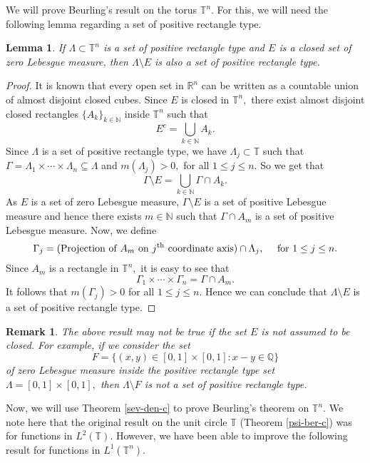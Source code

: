 \documentclass [11pt]{amsart}
\newtheorem{rem}{Remark}[section]
\newtheorem{Lem}{Lemma}[section]
\newcommand{\R}{\mathbb R}
\newcommand{\T}{\mathbb T}
\newcommand{\N}{\mathbb N}
\newcommand{\txt} {\textmd}
\numberwithin{equation}{section}
\begin{document}
We will prove Beurling's result on the torus $\T^n.$ For this, we will need the following lemma regarding a set of positive rectangle type.
\begin{Lem}\label{positive rectangle type}
	If $\Lambda\subset \T^n$ is a set of positive rectangle type and $E$ is a closed set of zero Lebesgue measure, then $\Lambda \setminus E$ is also a set of positive rectangle type. 
\end{Lem} 
\begin{proof}
	 It is known that every open set in $\R^n$ can be written as a countable union of almost disjoint closed cubes. Since $E$ is closed in $\T^n,$ there exist almost disjoint closed rectangles $\{A_k\}_{k\in \N}$ inside $\T^n$ such that 
	$$ E^c=\bigcup_{k\in \N} A_k.$$
	Since $\Lambda$ is a set of positive rectangle type, we have $\Lambda_j\subset \T$ such that $\Gamma = \Lambda_1\times \cdots \times \Lambda_n \subseteq \Lambda$ and $m(\Lambda_j)>0,$ for all $1\leq j \leq n.$ So we get that $$\Gamma \setminus E= \bigcup_{k\in \N}\Gamma \cap A_k.$$
	As $E$ is a set of zero Lebesgue measure, $\Gamma \setminus E$ is a set of positive Lebesgue measure and hence there exists $m\in \N$ such that $\Gamma \cap A_m$ is a set of positive Lebesgue measure. Now, we define  
	$$\Gamma_j= (\text{Projection of  } A_m \text{ on } j^{\txt{th}} \text{ coordinate axis}) \cap \Lambda_j, \quad \txt{ for } 1\leq j \leq n. $$
	Since $A_m$ is a rectangle in $\T^n,$ it is easy to see that 
	$$\Gamma_1\times \cdots \times \Gamma_n =\Gamma \cap A_m.$$
	It follows that $m(\Gamma_j)>0$ for all $1\leq j \leq n.$ Hence we can conclude that $\Lambda\setminus E$ is a set of positive rectangle type.
\end{proof}

\begin{rem}
The above result may not be true if the set $E$ is not assumed to be closed. For example, if we consider the set 
$$F=\lbrace (x,y)\in [0,1]\times [0,1] : x-y \in \mathbb{Q} \rbrace$$ 
of zero Lebesgue measure inside the positive rectangle type set $\Lambda = [0,1]\times [0,1],$ then $\Lambda \setminus F$ is not a set of positive rectangle type.
\end{rem}

Now, we will use Theorem \ref{sev-den-c} to prove Beurling's theorem on $\T^n.$ We note here that the original result on the unit circle $\T$ (Theorem \ref{psi-ber-c}) was for functions in $L^2(\T).$ However, we have been able to improve the following result for functions in $L^1(\T^n).$
\end{document}
